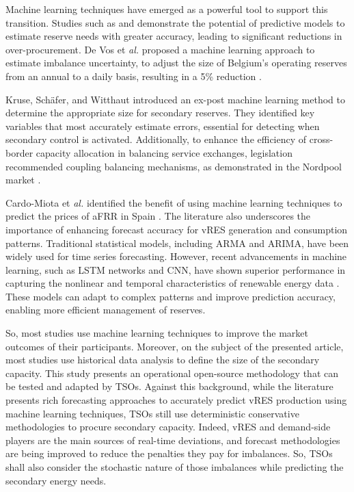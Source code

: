 Machine learning techniques have emerged as a powerful tool to support this transition. Studies such as \cite{DeVos2019} and \cite{Kruse2022} demonstrate the potential of predictive models to estimate reserve needs with greater accuracy, leading to significant reductions in over-procurement. 
De Vos et \textit{al.} proposed a machine learning approach to estimate imbalance uncertainty, to adjust the size of Belgium's operating reserves from an annual to a daily basis, resulting in a 5\% reduction \cite{DeVos2019}. 

Kruse, Sch\"{a}fer, and Witthaut introduced an ex-post machine learning method to determine the appropriate size for secondary reserves. They identified key variables that most accurately estimate errors, essential for detecting when secondary control is activated. Additionally, to enhance the efficiency of cross-border capacity allocation in balancing service exchanges, legislation recommended coupling balancing mechanisms, as demonstrated in the Nordpool market \cite{Frade:19c,Khodadadi:20}.\par
Cardo-Miota et \textit{al.} identified the benefit of using machine learning techniques to predict the prices of \gls{aFRR} in Spain \cite{Cardo-Miota:23}.
The literature also underscores the importance of enhancing forecast accuracy for \gls{vRES} generation and consumption patterns. Traditional statistical models, including ARMA and ARIMA, have been widely used for time series forecasting. However, recent advancements in machine learning, such as \gls{LSTM} networks and \gls{CNN}, have shown superior performance in capturing the nonlinear and temporal characteristics of renewable energy data \cite{Couto:21,Benti2023}. These models can adapt to complex patterns and improve prediction accuracy, enabling more efficient management of reserves.\par

\textcolor[rgb]{0,0,0.5}{So, most studies use machine learning techniques to improve the market outcomes of their participants. Moreover, on the subject of the presented article, most studies use historical data analysis to define the size of the secondary capacity. This study presents an operational open-source methodology that can be tested and adapted by \gls{TSO}s. 
Against this background, while the literature presents rich forecasting approaches to accurately predict \gls{vRES} production using machine learning techniques, \gls{TSO}s still use deterministic conservative methodologies to procure secondary capacity. Indeed, vRES and demand-side players are the main sources of real-time deviations, and forecast methodologies are being improved to reduce the penalties they pay for imbalances. So, \gls{TSO}s shall also consider the stochastic nature of those imbalances while predicting the secondary energy needs.}


